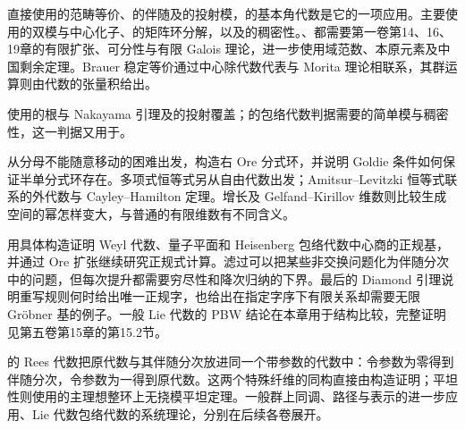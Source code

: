 直接使用的范畴等价、的伴随及的投射模，的基本角代数是它的一项应用。主要使用的双模与中心化子、的矩阵环分解，以及的稠密性。、都需要第一卷第14、16、19章的有限扩张、可分性与有限 Galois 理论，进一步使用域范数、本原元素及中国剩余定理。Brauer 稳定等价通过中心除代数代表与 Morita 理论相联系，其群运算则由代数的张量积给出。

\ProseParagraphBreak
{}使用的根与 Nakayama 引理及的投射覆盖；的包络代数判据需要的简单模与稠密性，这一判据又用于。

\ProseParagraphBreak
{}从分母不能随意移动的困难出发，构造右 Ore 分式环，并说明 Goldie 条件如何保证半单分式环存在。多项式恒等式另从自由代数出发；Amitsur--Levitzki 恒等式联系的外代数与 Cayley--Hamilton 定理。增长及 Gelfand--Kirillov 维数则比较生成空间的幂怎样变大，与普通的有限维数有不同含义。

\ProseParagraphBreak
{}用具体构造证明 Weyl 代数、量子平面和 Heisenberg 包络代数中心商的正规基，并通过 Ore 扩张继续研究正规式计算。滤过可以把某些非交换问题化为伴随分次中的问题，但每次提升都需要穷尽性和降次归纳的下界。最后的 Diamond 引理说明重写规则何时给出唯一正规字，也给出在指定字序下有限关系却需要无限 Gröbner 基的例子。一般 Lie 代数的 PBW 结论在本章用于结构比较，完整证明见第五卷第15章的第15.2节。

\ProseParagraphBreak
{}的 Rees 代数把原代数与其伴随分次放进同一个带参数的代数中：令参数为零得到伴随分次，令参数为一得到原代数。这两个特殊纤维的同构直接由构造证明；平坦性则使用的主理想整环上无挠模平坦定理。一般群上同调、路径与表示的进一步应用、Lie 代数包络代数的系统理论，分别在后续各卷展开。






